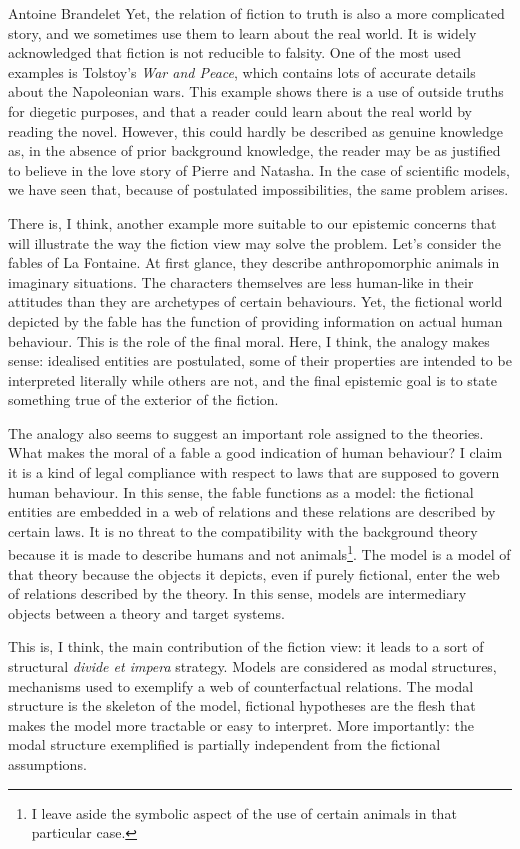 \begin{artengenv}{Antoine Brandelet}
Yet, the relation of fiction to truth is also a more complicated story, and we sometimes use them to learn about the real world. It is widely acknowledged that fiction is not reducible to falsity. One of the most used examples is Tolstoy's \textit{War and Peace}, which contains lots of accurate details about the Napoleonian wars. This example shows there is a use of outside truths for diegetic purposes, and that a reader could learn about the real world by reading the novel. However, this could hardly be described as genuine knowledge as, in the absence of prior background knowledge, the reader may be as justified to believe in the love story of Pierre and Natasha. In the case of scientific models, we have seen that, because of postulated impossibilities, the same problem arises.

There is, I think, another example more suitable to our epistemic concerns that will illustrate the way the fiction view may solve the problem. Let's consider the fables of La Fontaine. At first glance, they describe anthropomorphic animals in imaginary situations. The characters themselves are less human-like in their attitudes than they are archetypes of certain behaviours. Yet, the fictional world depicted by the fable has the function of providing information on actual human behaviour. This is the role of the final moral. Here, I think, the analogy makes sense: idealised entities are postulated, some of their properties are intended to be interpreted literally while others are not, and the final epistemic goal is to state something true of the exterior of the fiction.

The analogy also seems to suggest an important role assigned to the theories. What makes the moral of a fable a good indication of human behaviour? I claim it is a kind of legal compliance with respect to laws that are supposed to govern human behaviour. In this sense, the fable functions as a model: the fictional entities are embedded in a web of relations and these relations are described by certain laws. It is no threat to the compatibility with the background theory because it is made to describe humans and not animals\footnote{I leave aside the symbolic aspect of the use of certain animals in that particular case.}. The model is a model of that theory because the objects it depicts, even if purely fictional, enter the web of relations described by the theory. In this sense, models are intermediary objects between a theory and target systems.

This is, I think, the main contribution of the fiction view: it leads to a sort of structural \textit{divide et impera} strategy. Models are considered as modal structures, mechanisms used to exemplify a web of counterfactual relations. The modal structure is the skeleton of the model, fictional hypotheses are the flesh that makes the model more tractable or easy to interpret. More importantly: the modal structure exemplified is partially independent from the fictional assumptions. 


\end{artengenv}
